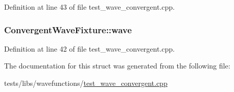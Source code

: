 Definition at line 43 of file test\-\_\-wave\-\_\-convergent.\-cpp.

\hypertarget{struct_convergent_wave_fixture_a4954bb2faa8afdc9f454f5cfb1fa5161}{
\subsubsection[{wave}]{ Convergent\-Wave\-Fixture\-::wave}}\label{struct_convergent_wave_fixture_a4954bb2faa8afdc9f454f5cfb1fa5161}


Definition at line 42 of file test\-\_\-wave\-\_\-convergent.\-cpp.



The documentation for this struct was generated from the following file\-:\begin{DoxyCompactItemize}
\item 
tests/libs/wavefunctions/\hyperlink{test__wave__convergent_8cpp}{test\-\_\-wave\-\_\-convergent.\-cpp}\end{DoxyCompactItemize}
